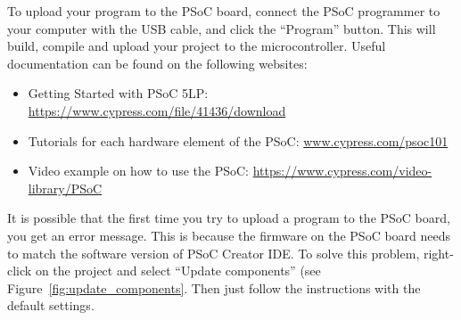 To upload your program to the PSoC board, connect the PSoC programmer to your computer with the USB cable, and click the ``Program'' button. This will build, compile and upload your project to the microcontroller. Useful documentation can be found on the following websites: 
\begin{itemize}
	\item Getting Started with PSoC 5LP: \url{https://www.cypress.com/file/41436/download}
	\item Tutorials for each hardware element of the PSoC: \url{www.cypress.com/psoc101}
  \item Video example on how to use the PSoC: \url{https://www.cypress.com/video-library/PSoC}
\end{itemize}
It is possible that the first time you try to upload a program to the PSoC board, you get an error message. This is because the firmware on the PSoC board needs to match the software version of PSoC Creator IDE. To solve this problem, right-click on the project and select ``Update components'' (see Figure~\ref{fig:update_components}. Then just follow the instructions with the default settings. 
